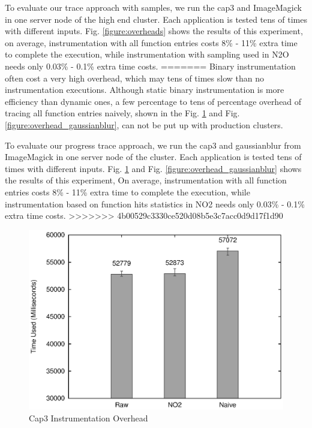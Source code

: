 To evaluate our trace approach with samples, we run the cap3 and ImageMagick in one server node of the high end cluster. Each application is tested tens of times with different inputs. Fig.  \ref{figure:overheads} shows the results of this experiment, on average, instrumentation with all function entries costs 8\% - 11\% extra time to complete the execution, while instrumentation with sampling used in N2O needs only 0.03\% - 0.1\% extra time costs.
=======
Binary instrumentation often cost a very high overhead, which may tens of times slow than no instrumentation executions. Although static binary instrumentation is more efficiency than dynamic ones, a few percentage to tens of percentage overhead of tracing all function entries naively, shown in the Fig. \ref{figure:overhead_cap3} and Fig. \ref{figure:overhead_gaussianblur}, can not be put up with production clusters. 

To evaluate our progress trace approach, we run the cap3 and gaussianblur from ImageMagick in one server node of the cluster. Each application is tested tens of times with different inputs. Fig. \ref{figure:overhead_cap3} and Fig. \ref{figure:overhead_gaussianblur} shows the results of this experiment, On average, instrumentation with all function entries costs 8\% - 11\% extra time to complete the execution, while instrumentation based on function hits statistics in NO2 needs only 0.03\% - 0.1\% extra time costs.
>>>>>>> 4b00529c3330ce520d08b5e3c7acc0d9d17f1d90

\begin{figure}
\centering
  \includegraphics[width=0.9\columnwidth]{figures/overhead_cap3.eps}
\caption{Cap3 Instrumentation Overhead}
\label{figure:overhead_cap3}
\end{figure}

